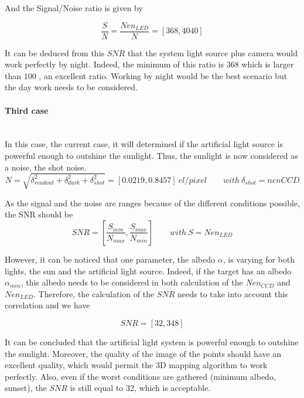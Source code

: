 And the Signal/Noise ratio is given by

\begin{equation}
\label{eq:Signal Noise Ratio case2}
\frac{S}{N} = \frac{Nen_{LED}}{N} = [368, 4040]
\end{equation}

It can be deduced from this $SNR$ that the system light source plus camera would work perfectly by night. Indeed, the minimum of this ratio is $368$ which is larger than $100$
, an excellent ratio. Working by night would be the best scenario but the day work needs to be considered.


\paragraph*{Third case} \label{thirdcase}
~~\\
In this case, the current case, it will determined if the artificial light source is powerful enough to outshine the sunlight. Thus, the sunlight is now considered as a noise, the shot noise. 
\begin{equation}
\label{eq:Noise case3}
N = \sqrt{\delta_{readout}^2+\delta_{dark}^2+\delta_{shot}^2} = [0.0219, 0.8457]\ el/pixel \qquad with\ \delta_{shot} = nenCCD
\end{equation}


As the signal and the noise are ranges because of the different conditions possible, the SNR should be 
\begin{equation*}
SNR = \left[\frac{S_{min}}{N_{max}}, \frac{S_{max}}{N_{min}}\right] \qquad with\ S=Nen_{LED}
\end{equation*}

However, it can be noticed that one parameter, the albedo $\alpha$, is varying for both lights, the sun and the artificial light source. Indeed, if the target has an albedo $\alpha_{min}$, this albedo needs to be considered in both calculation of the $Nen_{CCD}$ and $Nen_{LED}$. Therefore, the calculation of the $SNR$ needs to take into account this correlation and we have

\begin{equation}
SNR = [32, 348]
\end{equation}

It can be concluded that the artificial light system is powerful enough to outshine the sunlight. Moreover, the quality of the image of the points should have an excellent quality, which would permit the 3D mapping algorithm to work perfectly. Also, even if the worst conditions are gathered (minimum albedo, sunset), the $SNR$ is still equal to 32, which is acceptable.


